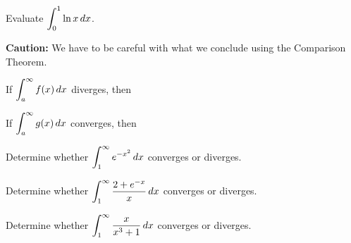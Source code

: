 \documentclass[12pt]{article}
\begin{document}
\newpage

\Example Evaluate $\displaystyle\int_0^1\ln x\,dx$.

\newpage


\vspace{5mm}

\textbf{Caution:} We have to be careful with what we conclude using the Comparison Theorem.

\vspace{5mm}

If $\displaystyle\int_a^\infty f(x)\,dx$ diverges, then

\vspace{25mm}

If $\displaystyle\int_a^\infty g(x)\,dx$ converges, then

\vspace{25mm}

\Example Determine whether $\displaystyle\int_1^\infty e^{-x^2}\,dx$ converges or diverges.

\newpage



\Example Determine whether $\displaystyle\int_1^\infty\frac{2+e^{-x}}{x}\,dx$ converges or diverges.

\vfill

\Example Determine whether $\displaystyle\int_1^\infty\frac{x}{x^3+1}\,dx$ converges or diverges.

\vfill
\end{document}
